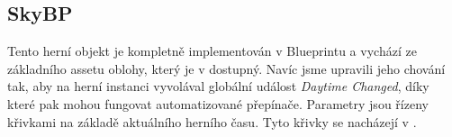 \subsection{SkyBP}

Tento herní objekt je kompletně implementován v Blueprintu a vychází ze základního assetu oblohy, který je v \UEu{} dostupný. Navíc jsme upravili jeho chování tak, aby na herní instanci vyvolával globální událost \textit{Daytime Changed}, díky které pak mohou fungovat automatizované přepínače. Parametry jsou řízeny křivkami na základě aktuálního herního času. Tyto křivky se nacházejí v .




